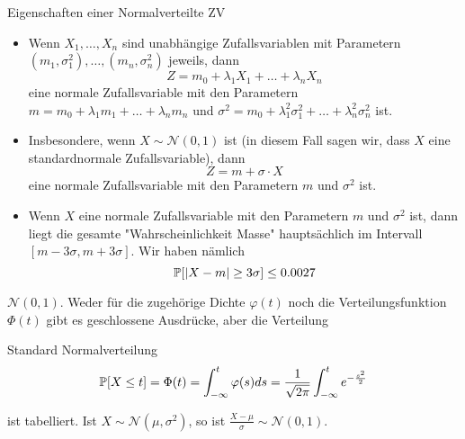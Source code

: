 \begin{subbox}{Eigenschaften einer Normalverteilte ZV}
    \begin{itemize}
        \item Wenn $X_1, \ldots , X_n$ sind unabhängige Zufallsvariablen mit Parametern $(m_1, \sigma^2_1), \ldots, (m_n, \sigma^2_n)$
        jeweils, dann
        $$Z = m_0 + \lambda_1X_1 + \ldots + \lambda_nX_n$$
        eine normale Zufallsvariable mit den Parametern $m = m_0 + \lambda_1m_1 + \ldots + \lambda_nm_n$ und $\sigma^2 = m_0 + \lambda^2_1\sigma^2_1 + \ldots + \lambda^2_n\sigma^2_n$ ist.
        \item Insbesondere, wenn $X \sim \mathcal{N}(0, 1)$ ist (in diesem Fall sagen wir, dass $X$ eine standardnormale
        Zufallsvariable), dann $$Z = m + \sigma \cdot X$$
        eine normale Zufallsvariable mit den Parametern $m$ und $\sigma^2$ ist.
        \item Wenn $X$ eine normale Zufallsvariable mit den Parametern $m$ und $\sigma^2$ ist, dann liegt die gesamte "Wahrscheinlichkeit
        Masse" hauptsächlich im Intervall $[m - 3\sigma, m + 3\sigma]$. Wir haben nämlich
        $$\mathbb{P}[ |X - m| \geq 3\sigma] \leq 0.0027$$
    \end{itemize}
\end{subbox}


 $\mathcal{N}(0,1)$. Weder für die zugehörige Dichte $\varphi(t)$ noch die Verteilungsfunktion $\Phi(t)$ gibt es geschlossene Ausdrücke, aber die Verteilung
\begin{mainbox}{Standard Normalverteilung}
    $$\mathbb{P}[X \leq t] = \Phi(t) = \int_{-\infty}^t \varphi(s)ds = \frac{1}{\sqrt{2 \pi}} \int_{-\infty}^t e^{-\frac{s^2}{2}}$$
\end{mainbox}


ist tabelliert. Ist $X \sim \mathcal{N}(\mu,\sigma^2)$, so ist $\frac{X - \mu}{\sigma} \sim \mathcal{N}(0,1)$.
